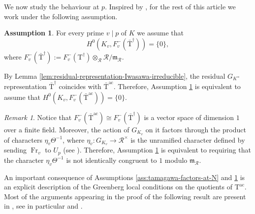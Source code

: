 \documentclass[12pt,reqno]{amsart}
\theoremstyle{definition}
\newtheorem{assumption}[theorem]{Assumption}
\theoremstyle{remark}
\newtheorem{remark}[theorem]{Remark}
\newcommand{\T}{\boldsymbol{\mathrm{T}}}
\DeclareMathOperator{\Fr}{Fr}
\newcommand{\ac}{\mathrm{ac}}
\newcommand{\m}{\mathfrak{m}}
\begin{document}
We now study the behaviour at $p$. Inspired by \cite[Hypothesis H.stz]{Buyukboduk:big-Heegner-point-kolyvagin-system}, for the rest of this article we work under the following assumption.

\begin{assumption}\label{ass:H.stz}
    For every prime $v\mid p$ of $K$ we assume that
    \begin{equation*}
        H^0(K_v, F_v^-(\bar{\T}^{\dag}))=\{0\},
    \end{equation*}
    where $F_v^-(\bar{\T}^{\dag}):=F_v^-(\T^{\dag})\otimes_{\mathcal{R}}\mathcal{R}/\mathfrak{m}_\mathcal{R}$.
\end{assumption}

 By Lemma \ref{lem:residual-representation-Iwasawa-irreducible}, the residual $G_K$-representation $\bar{\T}^\dag$ coincides with $\bar{\T}^{\ac}$. Therefore, Assumption \ref{ass:H.stz} is equivalent to assume that $H^0(K_v, F_v^-(\bar{\T}^{\ac}))=\{0\}$.

\begin{remark}
    Notice that $F_v^-(\bar{\T}^{\ac})\cong F_v^-(\bar{\T}^{\dag})$ is a vector space of dimension $1$ over a finite field. Moreover, the action of $G_{K_v}$ on it factors through the product of characters $\eta_v\Theta^{-1}$, where $\eta_v\colon G_{K_v}\to\mathcal{R}^{\times}$ is the unramified character defined by sending $\Fr_v$ to $U_p$ (see \cite[p. 300]{Longo-Vigni11:quaternion-algebras-Hida-families}). Therefore, Assumption \ref{ass:H.stz} is equivalent to requiring that the character $\eta_v\Theta^{-1}$ is not identically congruent to $1$ modulo $\m_{\mathcal{R}}$. 
\end{remark}


An important consequence of Assumptions \ref{ass:tamagawa-factors-at-N} and \ref{ass:H.stz} is an explicit description of the Greenberg local conditions on the quotients of $\T^{\ac}$. Most of the arguments appearing in the proof of the following result are present in \cite{Buyukboduk:big-Heegner-point-kolyvagin-system}, see in particular \cite[proof of Corollary 4.23]{Buyukboduk:big-Heegner-point-kolyvagin-system} and \cite[proof of Proposition 4.26]{Buyukboduk:big-Heegner-point-kolyvagin-system}.
\end{document}
